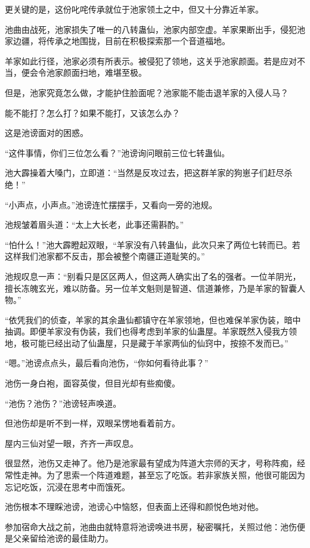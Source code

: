 \begin{this_body}
更关键的是，这份叱咤传承就位于池家领土之中，但又十分靠近羊家。

池曲由战死，池家损失了唯一的八转蛊仙，池家内部空虚。羊家果断出手，侵犯池家边疆，将传承之地围拢，目前在积极探索那一个音道福地。

羊家如此行径，池家必须有所表示。被侵犯了领地，这关乎池家颜面。若是应对不当，便会令池家颜面扫地，难堪至极。

但是，池家究竟怎么做，才能护住脸面呢？池家能不能击退羊家的入侵人马？

能不能打？怎么打？如果不能打，又该怎么办？

这是池谤面对的困惑。

“这件事情，你们三位怎么看？”池谤询问眼前三位七转蛊仙。

池大霹操着大嗓门，立即道：“当然是反攻过去，把这群羊家的狗崽子们赶尽杀绝！”

“小声点，小声点。”池谤连忙摆摆手，又看向一旁的池规。

池规皱着眉头道：“太上大长老，此事还需斟酌。”

“怕什么！”池大霹瞪起双眼，“羊家没有八转蛊仙，此次只来了两位七转而已。若这样我们池家都不反击，那会被整个南疆正道耻笑的。”

池规叹息一声：“别看只是区区两人，但这两人确实出了名的强者。一位羊阴光，擅长冻魄玄光，难以防备。另一位羊文魁则是智道、信道兼修，乃是羊家的智囊人物。”

“依凭我们的侦查，羊家的其余蛊仙都镇守在羊家领地，但也难保羊家伪装，暗中抽调。即便羊家没有伪装，我们也得考虑到羊家的仙蛊屋。羊家既然入侵我方领地，极可能已经出动了仙蛊屋，只是藏于羊家两仙的仙窍中，按捺不发而已。”

“嗯。”池谤点点头，最后看向池伤，“你如何看待此事？”

池伤一身白袍，面容英俊，但目光却有些痴傻。

“池伤？池伤？”池谤轻声唤道。

但池伤却是听不到一样，双眼呆愣地看着前方。

屋内三仙对望一眼，齐齐一声叹息。

很显然，池伤又走神了。他乃是池家最有望成为阵道大宗师的天才，号称阵痴，经常性走神。为了思索一个阵道难题，甚至忘了吃饭。若非家族关照，他很可能因为忘记吃饭，沉浸在思考中而饿死。

池伤根本不理睬池谤，池谤心中恼怒，但表面上还得和颜悦色地对他。

参加宿命大战之前，池曲由就特意将池谤唤进书房，秘密嘱托，关照过他：池伤便是父亲留给池谤的最佳助力。


\end{this_body}
